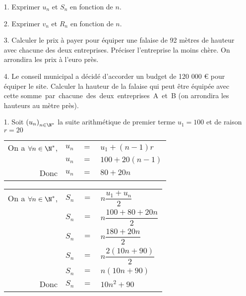 \begin{itemize}
\item[1.] Exprimer $u_n$ et $S_n$ en fonction de $n$. \\
\item[2.] Exprimer $v_n$ et $R_n$ en fonction de $n$. \\
\item[3.] Calculer le prix à payer pour équiper une falaise de 92 mètres de hauteur avec chacune des deux entreprises. Préciser l'entreprise la moins chère. On arrondira les prix à l'euro près. \\
\item[4.] Le conseil municipal a décidé d'accorder un budget de 120 000 € pour équiper le site. Calculer la hauteur de la falaise qui peut être équipée avec cette \hbox{somme par chacune des deux entreprises A et B} (on arrondira les hauteurs au mètre près). \\
\end{itemize}

\vspace*{.3cm}

\begin{itemize}
\item[1.] Soit $\left(u_n\right)_{n\in \N^*}$ la suite arithmétique de premier terme $u_1 = 100$ et de raison $r = 20$ \\

\begin{tabular}{rrll}
On a $\forall n \in \N^*$, & $u_n$ & $ =$ & $ u_1 + \left(n-1\right)r$ \\
& $u_n$ & $=$ & $100 + 20\left(n-1\right)$ \\
Donc & $u_n$ & $=$ & $80 + 20n$ \\
\end{tabular}

\vspace*{.3cm} 

\begin{tabular}{rrll}
On a $\forall n \in \N^*$, & $S_n$ & $ = $ & $ n \dfrac{u_1 + u_n}{2}$ \vspace*{.3cm} \\
& $S_n$ & $=$ & $n \dfrac{100 + 80 + 20n}{2}$ \vspace*{.3cm} \\
& $S_n$ & $=$ & $n \dfrac{180 + 20n}{2}$ \vspace*{.3cm} \\
& $S_n$ & $=$ & $n \dfrac{2\left(10n + 90\right)}{2}$ \vspace*{.3cm} \\
& $S_n$ & $=$ & $n\left(10n + 90\right)$ \vspace*{.3cm} \\
Donc & $S_n$ & $=$ & $10n^2 + 90$
\end{tabular}

\vspace*{-5cm}

\end{itemize}

